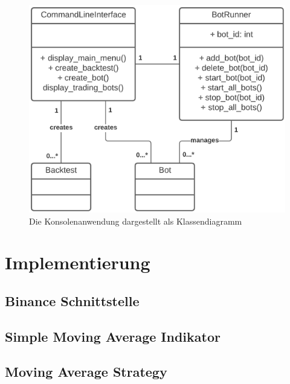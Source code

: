 \documentclass[oneside]{ausarbeitung}
\begin{document}
\begin{figure}[H]
  \centering
  \includegraphics[height=0.42\textheight]{uml/cli_uml.png}
  \caption{Die Konsolenanwendung dargestellt als Klassendiagramm}
  \label{fig:15}
\end{figure}

\chapter{Implementierung}
\label{cha:implementierung}


\section{Binance Schnittstelle}
\label{sec:entwurf_einer_konsolenanwendung}


\section{Simple Moving Average Indikator}
\label{sec:entwurf_einer_konsolenanwendung}


\section{Moving Average Strategy}
\label{sec:entwurf_einer_konsolenanwendung}
\end{document}
